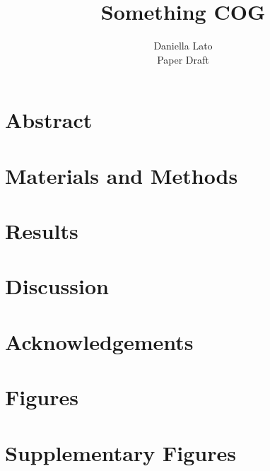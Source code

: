 \documentclass[11pt]{article}
\title{\sc Something COG}
\author{\sc Daniella Lato \\ \sc Paper Draft}
\newcommand{\beginsupplement}{%
	\setcounter{table}{0}
	\renewcommand{\thetable}{S\arabic{table}}%
	\setcounter{figure}{0}
	\renewcommand{\thefigure}{S\arabic{figure}}%
}
\begin{document}
	\thispagestyle{empty}
	\maketitle
	\thispagestyle{empty}	
	\newpage
	\doublespacing
	
	\section{Abstract}

	\section{Materials and Methods}
	
	\section{Results}
	
	\section{Discussion}

\section{Acknowledgements}	

	\newpage
	
	
	
	
	\newpage
	
	\section{Figures}
\newpage
	\section{Supplementary Figures}
	\beginsupplement
	
\end{document}
